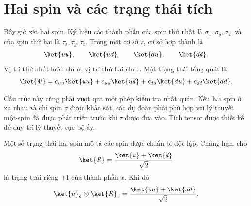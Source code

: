 \begin{classroomqa}
\end{classroomqa}

\section{Hai spin và các trạng thái tích}

Bây giờ xét hai spin. Ký hiệu các thành phần của spin thứ nhất là \(\sigma_x,\sigma_y,\sigma_z\), và của spin thứ hai là \(\tau_x,\tau_y,\tau_z\). Trong một cơ sở \(z\), cơ sở hợp thành là
\begin{equation}
\ket{uu},\qquad \ket{ud},\qquad \ket{du},\qquad \ket{dd}.
\label{eq:l6-two-spin-basis}
\end{equation}
Vị trí thứ nhất luôn chỉ \(\sigma\), vị trí thứ hai chỉ \(\tau\). Một trạng thái tổng quát là
\begin{equation}
\ket{\Psi}
=c_{uu}\ket{uu}+c_{ud}\ket{ud}
+c_{du}\ket{du}+c_{dd}\ket{dd}.
\label{eq:l6-general-two-spin}
\end{equation}

\begin{classroomqa}
\end{classroomqa}

Cấu trúc này cũng phải vượt qua một phép kiểm tra nhất quán. Nếu hai spin ở xa nhau và chỉ spin \(\sigma\) được khảo sát, các dự đoán phải phù hợp với lý thuyết một-spin đã được phát triển trước khi \(\tau\) được đưa vào. Tích tensor được thiết kế để duy trì lý thuyết cục bộ ấy.

Một số trạng thái hai-spin mô tả các spin được chuẩn bị độc lập. Chẳng hạn, cho
\begin{equation}
\ket{R}=\frac{\ket{u}+\ket{d}}{\sqrt2}
\end{equation}
là trạng thái riêng \(+1\) của thành phần \(x\). Khi đó
\begin{equation}
\ket{u}_{\sigma}\otimes\ket{R}_{\tau}
=\frac{\ket{uu}+\ket{ud}}{\sqrt2}.
\label{eq:l6-up-right-product}
\end{equation}

